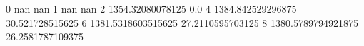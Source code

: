 0 nan nan
1 nan nan
2 1354.32080078125 0.0
4 1384.842529296875 30.521728515625
6 1381.5318603515625 27.2110595703125
8 1380.5789794921875 26.2581787109375
